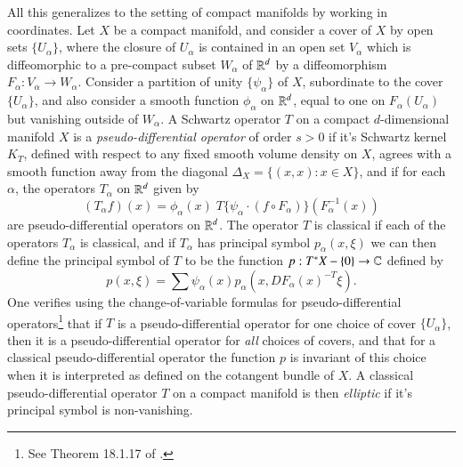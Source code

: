 All this generalizes to the setting of compact manifolds by working in coordinates. Let $X$ be a compact manifold, and consider a cover of $X$ by open sets $\{ U_\alpha \}$, where the closure of $U_\alpha$ is contained in an open set $V_\alpha$ which is diffeomorphic to a pre-compact subset $W_\alpha$ of $\operatorname{\mathbb{R}}^d$ by a diffeomorphism $F_\alpha: V_\alpha \to W_\alpha$. Consider a partition of unity $\{ \psi_\alpha \}$ of $X$, subordinate to the cover $\{ U_\alpha \}$, and also consider a smooth function $\phi_\alpha$ on $\operatorname{\mathbb{R}}^d$, equal to one on $F_\alpha(U_\alpha)$ but vanishing outside of $W_\alpha$. A Schwartz operator $T$ on a compact $d$-dimensional manifold $X$ is a \emph{pseudo-differential operator} of order $s > 0$ if it's Schwartz kernel $K_T$, defined with respect to any fixed smooth volume density on $X$, agrees with a smooth function away from the diagonal $\Delta_X = \{ (x,x): x \in X \}$, and if for each $\alpha$, the operators $T_\alpha$ on $\operatorname{\mathbb{R}}^d$ given by
%
\begin{equation}
    (T_\alpha f)(x) = \phi_\alpha(x)\; T \{ \psi_\alpha \cdot (f \circ F_\alpha) \} (F_\alpha^{-1}(x))
\end{equation}
%
are pseudo-differential operators on $\operatorname{\mathbb{R}}^d$. The operator $T$ is classical if each of the operators $T_\alpha$ is classical, and if $T_\alpha$ has principal symbol $p_\alpha(x,\xi)$ we can then define the principal symbol of $T$ to be the function $p: T^* X - \{ 0 \} \to \operatorname{\mathbb{C}}$ defined by
%
\begin{equation}
    p(x,\xi) = \sum \psi_\alpha(x) p_\alpha(x, DF_\alpha(x)^{-T} \xi).
\end{equation}
%
One verifies using the change-of-variable formulas for pseudo-differential operators\footnote{See Theorem 18.1.17 of \cite{Hormander3}.} that if $T$ is a pseudo-differential operator for one choice of cover $\{ U_\alpha \}$, then it is a pseudo-differential operator for \emph{all} choices of covers, and that for a classical pseudo-differential operator the function $p$ is invariant of this choice when it is interpreted as defined on the cotangent bundle of $X$. A classical pseudo-differential operator $T$ on a compact manifold is then \emph{elliptic} if it's principal symbol is non-vanishing.